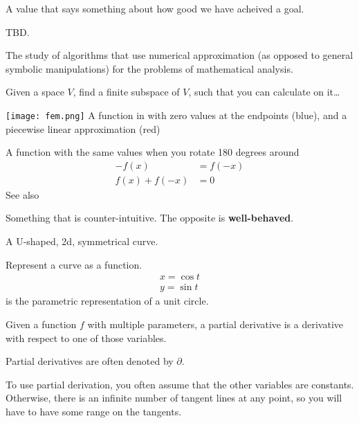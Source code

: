 \begin{definition}
    A value that says something about how good we have acheived a goal.
\end{definition}

\begin{definition}[Moment]
    TBD.\
\end{definition}

\begin{definition}
    The study of algorithms that use numerical approximation (as opposed to
    general symbolic manipulations) for the problems of mathematical analysis.

    Given a space $V$, find a finite subspace of $V$, such that you can
    calculate on it\dots

    \texttt{[image: fem.png]}
    A function in  with zero values at the endpoints (blue), and a piecewise
    linear approximation (red)

\end{definition}

\begin{definition}[Odd function]\label{oddfunc}
A function with the same values when you rotate 180 degrees around\dotso{}
    \begin{align}
        - f(x) &= f(-x) \\
        f(x) + f(-x) &= 0
    \end{align}
    See also~
\end{definition}

\begin{definition}[Pathological]
    Something that is counter-intuitive. The opposite is \textbf{well-behaved}.

\end{definition}

\begin{definition}[Parabola]
    A U-shaped, 2d, symmetrical curve.
\end{definition}

\begin{definition}[Parameterization]
    Represent a curve as a function.
    \begin{align}
        x = \cos{t} \\
        y = \sin{t}
    \end{align}
    is the parametric representation of a unit circle.
\end{definition}

\begin{definition}
    Given a function $f$ with multiple parameters, a partial derivative is a
    derivative with respect to one of those variables.

    Partial derivatives are often denoted by $\partial$.

    To use partial derivation, you often assume that the other variables are 
    constants. Otherwise, there is an infinite number of tangent lines at
    any point, so you will have to have some range on the tangents.

\end{definition}

